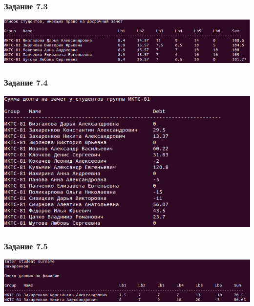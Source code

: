 \documentclass{article}
\begin{document}
        \subsubsection{Задание 7.3}

            \includegraphics[scale=0.35]{task7/task7.3.png}

        \subsubsection{Задание 7.4}

            \includegraphics[scale=0.35]{task7/task7.4.png}

        \subsubsection{Задание 7.5}

            \includegraphics[scale=0.35]{task7/task7.5.png}
\end{document}
